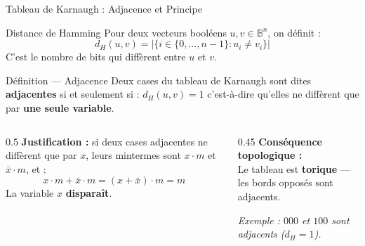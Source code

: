 \begin{frame}{Tableau de Karnaugh : Adjacence et Principe}

    \begin{block}{Distance de Hamming}
        Pour deux vecteurs booléens \(u, v \in \mathbb{B}^n\), on définit :
        \[
            d_H(u,v) = \big|\{ i \in \{0,\dots,n-1\} : u_i \neq v_i \}\big|
        \]
        C'est le nombre de bits qui diffèrent entre \(u\) et \(v\).
    \end{block}

    \vspace{0.2cm}

    \begin{alertblock}{Définition — Adjacence}
        Deux cases du tableau de Karnaugh sont dites \textbf{adjacentes} si et seulement si : $d_H(u, v) = 1$
        c'est-à-dire qu'elles ne diffèrent que par \textbf{une seule variable}.
    \end{alertblock}

    \vspace{0.1cm}

    \begin{columns}[T]
        \begin{column}{0.5\textwidth}
            \textbf{Justification :} si deux cases adjacentes ne diffèrent que par \(x\), leurs mintermes sont \(x \cdot m\) et \(\bar{x} \cdot m\), et :
            \[
                x \cdot m + \bar{x} \cdot m = (x + \bar{x}) \cdot m = m
            \]
            La variable \(x\) \textbf{disparaît}.
        \end{column}
        \begin{column}{0.45\textwidth}
            \textbf{Conséquence topologique :}\\
            Le tableau est \textbf{torique} — les bords opposés sont adjacents.

            \vspace{0.2cm}
            \textit{Exemple : \(000\) et \(100\) sont adjacents (\(d_H = 1\)).}
        \end{column}
    \end{columns}

\end{frame}

